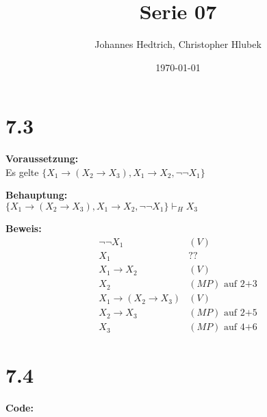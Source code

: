 \documentclass[12pt,a4paper]{scrartcl}
\title{Serie 07}
\author{Johannes Hedtrich, Christopher Hlubek}
\date{\today}
\begin{document}
  \section*{7.3}
  \noindent
  \textbf{Voraussetzung:}\\
  
  Es gelte $\{X_1 \rightarrow (X_2 \rightarrow X_3), X_1 \rightarrow X_2, \neg \neg X_1\}$

  \noindent
  \textbf{Behauptung:}\\ 
  
  $\{X_1 \rightarrow (X_2 \rightarrow X_3), X_1 \rightarrow X_2, \neg \neg X_1\} \vdash_H X_3$

  \noindent
  \textbf{Beweis:}\\
  
  \begin{align}
    & \neg \neg X_1 & (V)\\
    & X_1 & ?? &\\
    & X_1 \rightarrow X_2 & (V)\\
    & X_2 & (MP) \text{ auf 2+3}\\
    & X_1 \rightarrow (X_2 \rightarrow X_3) & (V)\\
    & X_2 \rightarrow X_3 & (MP) \text{ auf 2+5}\\
    & X_3 & (MP) \text{ auf 4+6}
  \end{align}
  
  \section*{7.4}
  \noindent
  \textbf{Code:}\\
  

  
\end{document}
